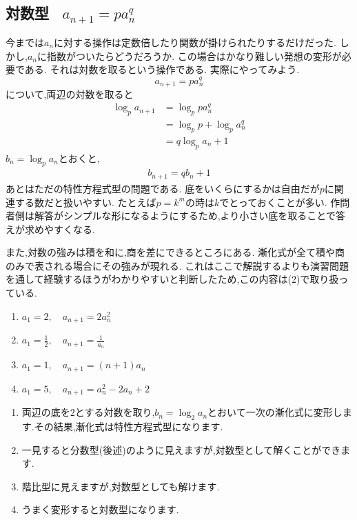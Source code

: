 
\subsection{\texorpdfstring{対数型 \, $a_{n+1}=pa_n^q$}{対数型}}\label{節：対数型}
  今までは$a_n$に対する操作は定数倍したり関数が掛けられたりするだけだった.
  しかし,$a_n$に指数がついたらどうだろうか.
  この場合はかなり難しい発想の変形が必要である.
  それは対数を取るという操作である.
  実際にやってみよう.
  \[
    a_{n+1}=pa_n^q
  \]
  について,両辺の対数を取ると
  \begin{align*}
    \log_p{a_{n+1}}&=\log_p{pa_n^q}\\
    &=\log_p{p}+\log_p{a_n^q}\\
    &=q\log_p{a_n}+1
  \end{align*}
  $b_n=\log_p{a_n}$とおくと,
  \begin{align*}
    b_{n+1}=qb_n+1
  \end{align*}
  あとはただの特性方程式型の問題である.
  底をいくらにするかは自由だが$p$に関連する数だと扱いやすい.
  たとえば$p=k^m$の時は$k$でとっておくことが多い.
  作問者側は解答がシンプルな形になるようにするため,より小さい底を取ることで答えが求めやすくなる.

  また,対数の強みは積を和に,商を差にできるところにある.
  漸化式が全て積や商のみで表される場合にその強みが現れる.
  これはここで解説するよりも演習問題を通して経験するほうがわかりやすいと判断したため,この内容は(2)で取り扱っている.

  \noindent{}
  \begin{enumerate}[label=(\arabic*),parsep=3pt,format=\bookitemlink{example-logarithmic-1}{problem}{answer}]
    \item $\displaystyle a_1=2,\quad a_{n+1}=2a_n^2$
    \item $\displaystyle a_1=\frac{1}{2},\quad a_{n+1}=\frac{1}{a_n}$
    \item $\displaystyle a_1=1,\quad a_{n+1}=(n+1)a_n$
    \item $\displaystyle a_1=5,\quad a_{n+1}=a_n^2-2a_n+2$
  \end{enumerate}

  \noindent{}
  \begin{enumerate}[label=(\arabic*),parsep=3pt,format=\bookitemlink{example-logarithmic-1}{hint}{problem}]
    \item 両辺の底を$2$とする対数を取り,$b_n=\log_2a_n$とおいて一次の漸化式に変形します.その結果,漸化式は特性方程式型になります.
    \item 一見すると分数型(後述)のように見えますが,対数型として解くことができます.
    \item 階比型に見えますが,対数型としても解けます.
    \item うまく変形すると対数型になります.
  \end{enumerate}

